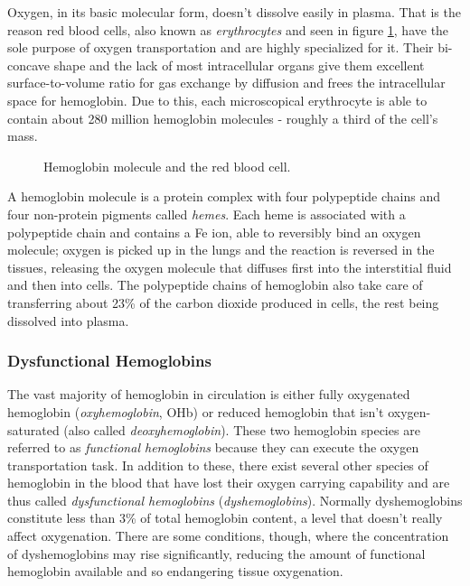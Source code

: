 Oxygen, in its basic molecular form, doesn't dissolve easily in plasma. That is the reason red blood cells, also known as \textit{erythrocytes} and seen in figure \ref{fig:rbc}, have the sole purpose of oxygen transportation and are highly specialized for it. Their bi-concave shape and the lack of most intracellular organs give them excellent surface-to-volume ratio for gas exchange by diffusion and frees the intracellular space for hemoglobin. Due to this, each microscopical erythrocyte is able to contain about 280 million hemoglobin molecules - roughly a third of the cell's mass.\ \cite{Tortora2000}

\begin{figure}[tcb]
\caption{Hemoglobin molecule and the red blood cell.\ \cite{mycozynook.com, medicinenet.com}}
\label{fig:rbc}
\end{figure}

A hemoglobin molecule is a protein complex with four polypeptide chains and four non-protein pigments called \textit{hemes}. Each heme is associated with a polypeptide chain and contains a Fe ion, able to reversibly bind an oxygen molecule; oxygen is picked up in the lungs and the reaction is reversed in the tissues, releasing the oxygen molecule that diffuses first into the interstitial fluid and then into cells. The polypeptide chains of hemoglobin also take care of transferring about 23\% of the carbon dioxide produced in cells, the rest being dissolved into plasma.\ \cite{Tortora2000}

\subsubsection{Dysfunctional Hemoglobins}

The vast majority of hemoglobin in circulation is either fully oxygenated hemoglobin (\textit{oxyhemoglobin}, OHb) or reduced hemoglobin that isn't oxygen-saturated (also called \textit{deoxyhemoglobin}). These two hemoglobin species are referred to as \textit{functional hemoglobins} because they can execute the oxygen transportation task. In addition to these, there exist several other species of hemoglobin in the blood that have lost their oxygen carrying capability and are thus called \textit{dysfunctional hemoglobins} (\textit{dyshemoglobins}). Normally dyshemoglobins constitute less than 3\% of total hemoglobin content, a level that doesn't really affect oxygenation. There are some conditions, though, where the concentration of dyshemoglobins may rise significantly, reducing the amount of functional hemoglobin available and so endangering tissue oxygenation.

